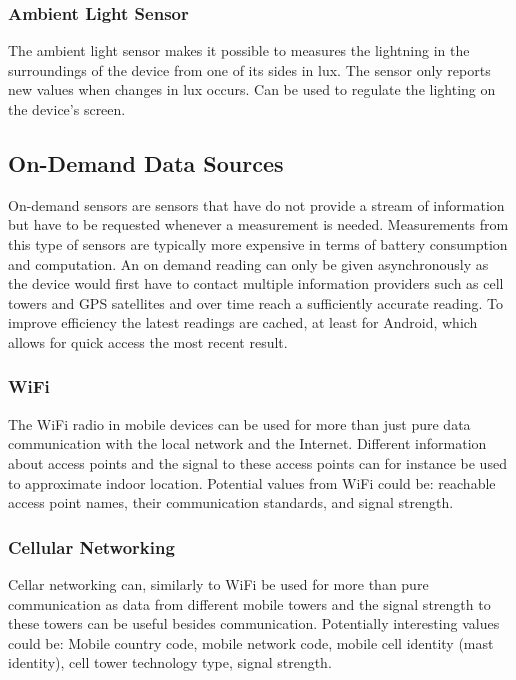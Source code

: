 \subsubsection{Ambient Light Sensor}
\label{sub:ambient_light_sensor}
The ambient light sensor makes it possible to measures the lightning in the surroundings of the device from one of its sides in lux. The sensor only reports new values when changes in lux occurs. Can be used to regulate the lighting on the device's screen. 

\subsection{On-Demand Data Sources}
\label{sub:on_demand_sensors}
On-demand sensors are sensors that have do not provide a stream of information but have to be requested whenever a measurement is needed. Measurements from this type of sensors are typically more expensive in terms of battery consumption and computation. An on demand reading can only be given asynchronously as the device would first have to contact multiple information providers such as cell towers and GPS satellites and over time reach a sufficiently accurate reading. To improve efficiency the latest readings are cached, at least for Android, which allows for quick access the most recent result.

\subsubsection{WiFi}
\label{sub:wifi}
The WiFi radio in mobile devices can be used for more than just pure data communication with the local network and the Internet. Different information about access points and the signal to these access points can for instance be used to approximate indoor location.  
Potential values from WiFi could be: reachable access point names, their communication standards, and signal strength.

\subsubsection{Cellular Networking}
\label{sub:cellular_networking}
Cellar networking can, similarly to WiFi be used for more than pure communication as data from different mobile towers and the signal strength to these towers can be useful besides communication. Potentially interesting values could be: Mobile country code, mobile network code, mobile cell identity (mast identity), cell tower technology type, signal strength.

